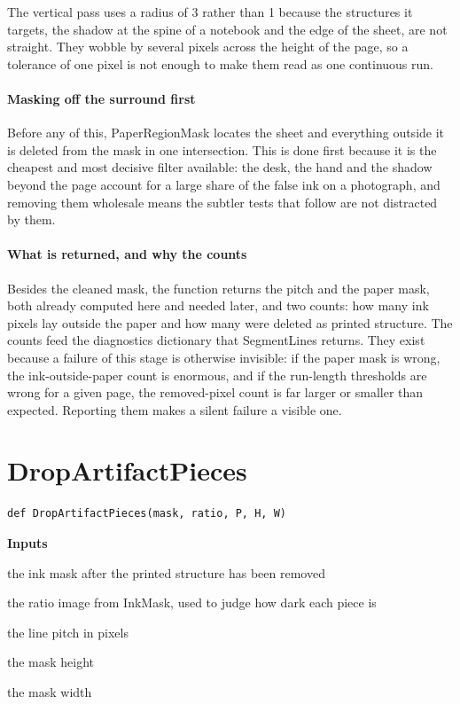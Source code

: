 The vertical pass uses a radius of 3 rather than 1 because the structures it targets, the shadow at the spine of a notebook and the edge of the sheet, are not straight. They wobble by several pixels across the height of the page, so a tolerance of one pixel is not enough to make them read as one continuous run.


\paragraph{Masking off the surround first}
Before any of this, PaperRegionMask locates the sheet and everything outside it is deleted from the mask in one intersection. This is done first because it is the cheapest and most decisive filter available: the desk, the hand and the shadow beyond the page account for a large share of the false ink on a photograph, and removing them wholesale means the subtler tests that follow are not distracted by them.


\paragraph{What is returned, and why the counts}
Besides the cleaned mask, the function returns the pitch and the paper mask, both already computed here and needed later, and two counts: how many ink pixels lay outside the paper and how many were deleted as printed structure. The counts feed the diagnostics dictionary that SegmentLines returns. They exist because a failure of this stage is otherwise invisible: if the paper mask is wrong, the ink-outside-paper count is enormous, and if the run-length thresholds are wrong for a given page, the removed-pixel count is far larger or smaller than expected. Reporting them makes a silent failure a visible one.


\section{DropArtifactPieces}
\begin{lstlisting}[style=sig]
def DropArtifactPieces(mask, ratio, P, H, W)
\end{lstlisting}

\noindent\textbf{Inputs}
\begin{description}[leftmargin=2.2em,style=nextline,font=\normalfont\ttfamily]\setlength\itemsep{1pt}
  \item[{mask}] \normalfont the ink mask after the printed structure has been removed
  \item[{ratio}] \normalfont the ratio image from InkMask, used to judge how dark each piece is
  \item[{P}] \normalfont the line pitch in pixels
  \item[{H}] \normalfont the mask height
  \item[{W}] \normalfont the mask width
\end{description}

